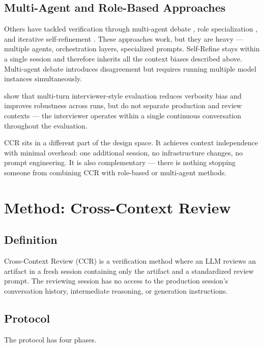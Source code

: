 \documentclass[11pt]{article}
\begin{document}
\subsection{Multi-Agent and Role-Based Approaches}

Others have tackled verification through multi-agent debate \citep{du2024improving,liang2024encouraging}, role specialization \citep{huang2024agentcoder,qian2024chatdev}, and iterative self-refinement \citep{madaan2023selfrefine}. These approaches work, but they are heavy --- multiple agents, orchestration layers, specialized prompts. Self-Refine \citep{madaan2023selfrefine} stays within a single session and therefore inherits all the context biases described above. Multi-agent debate introduces disagreement but requires running multiple model instances simultaneously.

\citet{kim2025interviewer} show that multi-turn interviewer-style evaluation reduces verbosity bias and improves robustness across runs, but do not separate production and review contexts --- the interviewer operates within a single continuous conversation throughout the evaluation.

CCR sits in a different part of the design space. It achieves context independence with minimal overhead: one additional session, no infrastructure changes, no prompt engineering. It is also complementary --- there is nothing stopping someone from combining CCR with role-based or multi-agent methods.

\section{Method: Cross-Context Review}

\subsection{Definition}

Cross-Context Review (CCR) is a verification method where an LLM reviews an artifact in a fresh session containing only the artifact and a standardized review prompt. The reviewing session has no access to the production session's conversation history, intermediate reasoning, or generation instructions.

\subsection{Protocol}

The protocol has four phases.
\end{document}
